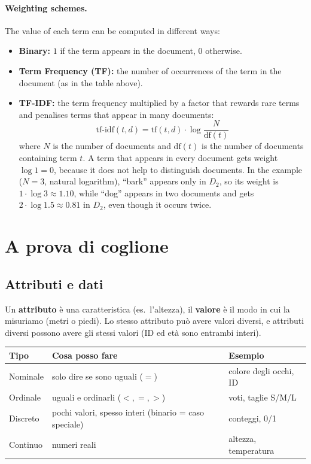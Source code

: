 \paragraph{Weighting schemes.} The value of each term can be computed in different ways:
\begin{itemize}
    \item \textbf{Binary:} $1$ if the term appears in the document, $0$ otherwise.
    \item \textbf{Term Frequency (TF):} the number of occurrences of the term in the document (as in the table above).
    \item \textbf{TF-IDF:} the term frequency multiplied by a factor that rewards rare terms and penalises terms that appear in many documents:
    \[
        \text{tf-idf}(t,d)=\text{tf}(t,d)\cdot\log\frac{N}{\text{df}(t)}
    \]
    where $N$ is the number of documents and $\text{df}(t)$ is the number of documents containing term $t$. A term that appears in every document gets weight $\log 1 = 0$, because it does not help to distinguish documents. In the example ($N=3$, natural logarithm), ``bark'' appears only in $D_2$, so its weight is $1\cdot\log 3\approx1.10$, while ``dog'' appears in two documents and gets $2\cdot\log 1.5\approx0.81$ in $D_2$, even though it occurs twice.
\end{itemize}


\section{A prova di coglione}

\subsection*{Attributi e dati}
Un \textbf{attributo} è una caratteristica (es.\ l'altezza), il \textbf{valore} è il modo in cui la misuriamo (metri o piedi). Lo stesso attributo può avere valori diversi, e attributi diversi possono avere gli stessi valori (ID ed età sono entrambi interi).

\begin{center}
\small
\begin{tabular}{@{}lll@{}}
\toprule
\textbf{Tipo} & \textbf{Cosa posso fare} & \textbf{Esempio} \\
\midrule
Nominale & solo dire se sono uguali ($=$) & colore degli occhi, ID \\
Ordinale & uguali e ordinarli ($<,=,>$) & voti, taglie S/M/L \\
Discreto & pochi valori, spesso interi (binario = caso speciale) & conteggi, 0/1 \\
Continuo & numeri reali & altezza, temperatura \\
\bottomrule
\end{tabular}
\end{center}

